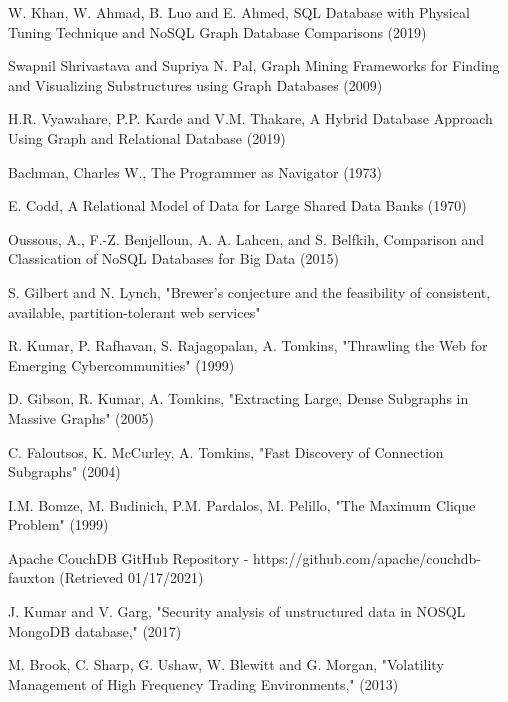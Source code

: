 \documentclass[10pt,        %
               a4paper,     %
               journal,     %
               ]{IEEEtran}
\begin{document}
\begin{thebibliography}{3}

W. Khan, W. Ahmad, B. Luo and E. Ahmed, SQL Database with Physical Tuning Technique and NoSQL Graph Database Comparisons (2019)

Swapnil Shrivastava and Supriya N. Pal, Graph Mining Frameworks for Finding and Visualizing Substructures using Graph Databases (2009)

H.R. Vyawahare, P.P. Karde and V.M. Thakare, A Hybrid Database Approach Using Graph and Relational Database (2019)

Bachman, Charles W., The Programmer as Navigator (1973)

E. Codd, A Relational Model of Data for Large Shared Data Banks (1970)

Oussous, A., F.-Z. Benjelloun, A. A. Lahcen, and S. Belfkih, Comparison and Classication of NoSQL Databases for Big Data (2015)

S. Gilbert and N. Lynch, "Brewer's conjecture and the feasibility of consistent, available, partition-tolerant web services"

R. Kumar, P. Rafhavan, S. Rajagopalan, A. Tomkins, "Thrawling the Web for Emerging Cybercommunities" (1999)

D. Gibson, R. Kumar, A. Tomkins, "Extracting Large, Dense Subgraphs in Massive Graphs" (2005)

C. Faloutsos, K. McCurley, A. Tomkins, "Fast Discovery of Connection Subgraphs" (2004)

I.M. Bomze, M. Budinich, P.M. Pardalos, M. Pelillo, "The Maximum Clique Problem" (1999)

Apache CouchDB GitHub Repository - https://github.com/apache/couchdb-fauxton (Retrieved 01/17/2021)

J. Kumar and V. Garg, "Security analysis of unstructured data in NOSQL MongoDB database," (2017)

M. Brook, C. Sharp, G. Ushaw, W. Blewitt and G. Morgan, "Volatility Management of High Frequency Trading Environments," (2013)

\end{thebibliography}
\end{document}
